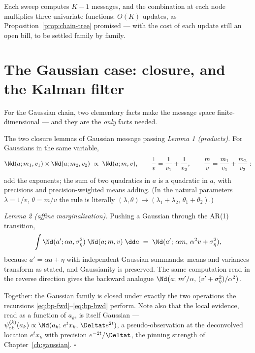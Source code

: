 Each sweep computes $K - 1$ messages, and the combination at each node
multiplies three univariate functions: $O(K)$ updates, as
Proposition~\ref{prop:chain-tree} promised --- with the cost of each
update still an open bill, to be settled family by family.

\section{The Gaussian case: closure, and the Kalman filter}
\label{sec:bp-gaussian}

For the Gaussian chain, two elementary facts make the message space
finite-dimensional --- and they are the \emph{only} facts needed.

\begin{toolbox}{The two closure lemmas of Gaussian message passing}
\emph{Lemma 1 (products).} For Gaussians in the same variable,
\begin{equation*}
  \Nd(a; m_1, v_1) \times \Nd(a; m_2, v_2)
  \;\propto\; \Nd(a; m, v),
  \qquad
  \frac{1}{v} = \frac{1}{v_1} + \frac{1}{v_2},
  \qquad
  \frac{m}{v} = \frac{m_1}{v_1} + \frac{m_2}{v_2} :
\end{equation*}
add the exponents; the sum of two quadratics in $a$ is a quadratic in $a$,
with precisions and precision-weighted means adding. (In the natural
parameters $\lambda = 1/v$, $\theta = m/v$ the rule is literally
$(\lambda, \theta) \mapsto (\lambda_1 + \lambda_2,\,
\theta_1 + \theta_2)$.)

\emph{Lemma 2 (affine marginalisation).} Pushing a Gaussian through the
AR(1) transition,
\begin{equation*}
  \int \Nd(a'; \alpha a, \sigma_\eta^2)\; \Nd(a; m, v)\; \dd a
  \;=\; \Nd(a';\, \alpha m,\, \alpha^2 v + \sigma_\eta^2),
\end{equation*}
because $a' = \alpha a + \eta$ with independent Gaussian summands: means
and variances transform as stated, and Gaussianity is preserved. The same
computation read in the reverse direction gives the backward analogue
$\Nd\big(a;\, m'/\alpha,\, (v' + \sigma_\eta^2)/\alpha^2\big)$.

Together: the Gaussian family is closed under exactly the two operations
the recursions \eqref{eq:bp-fwd}--\eqref{eq:bp-bwd} perform. Note also
that the local evidence, read as a function of $a_k$, is itself Gaussian
--- $\psi^{(k)}_{\mathrm{ob}}(a_k) \propto
\Nd(a_k;\, e^{t} x_k,\, \Deltat e^{2t})$, a pseudo-observation at the
deconvolved location $e^t x_k$ with precision $e^{-2t}/\Deltat$, the
pinning strength of Chapter~\ref{ch:gaussian}. \hfill$\square$
\end{toolbox}

